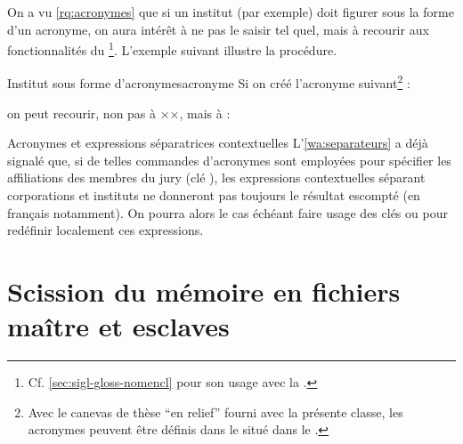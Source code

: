 On a vu \vref{rq:acronymes} que si un institut (par exemple) doit figurer
sous la forme d'un acronyme, on aura intérêt à ne pas le saisir tel
quel, mais à recourir aux fonctionnalités du
\footnote{Cf. \vref{sec:sigl-gloss-nomencl} pour
  son usage avec la \yatcl.}. L'exemple suivant illustre la
procédure.
%
\begin{dbexample}{Institut sous forme d'acronymes}{acronyme}
  Si on créé l'acronyme suivant\footnote{Avec le canevas de thèse \enquote{en
      relief} fourni avec la présente classe, les acronymes peuvent être
    définis dans le \File{\acronymsfile} situé dans le
    \Directory{\configurationdirectory}.} :
\begin{preamblecode}
\end{preamblecode}
on peut recourir, non pas à ××, mais à :
\begin{preamblecode}
\end{preamblecode}
\end{dbexample}

\begin{dbremark}{Acronymes et expressions séparatrices contextuelles}{}
  L'\vref{wa:separateurs} a déjà signalé que, si de telles commandes
  d'acronymes sont employées pour spécifier les affiliations des
  membres du jury (clé ), les expressions contextuelles séparant
  corporations et instituts ne donneront pas toujours le résultat escompté (en
  français notamment). On pourra alors le cas échéant faire usage des clés
   ou  pour redéfinir
  localement ces expressions.
\end{dbremark}

\section{Scission du mémoire en fichiers maître et esclaves}
\label{sec:repart-du-memo}

